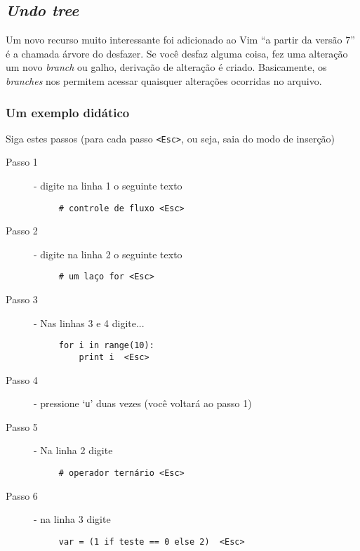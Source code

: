 \subsection{{\em Undo tree}}
\label{Undo tree}

Um novo recurso muito interessante foi adicionado ao Vim ``a partir da
versão 7''  é a chamada árvore do desfazer.  Se
você desfaz alguma coisa, fez uma alteração um novo {\em branch} ou
galho, derivação de alteração é criado.  Basicamente, os {\em branches}
nos permitem acessar quaisquer alterações ocorridas no arquivo.

\subsubsection{Um exemplo didático}
\label{Um exemplo didático}

Siga estes passos (para cada passo \verb|<Esc>|, ou seja, saia do modo
de inserção)


\begin{description}
\item [Passo 1] - digite na linha 1 o seguinte texto
\begin{verbatim}
     # controle de fluxo <Esc>
\end{verbatim}

\item [Passo 2] - digite na linha 2 o seguinte texto
\begin{verbatim}
     # um laço for <Esc>
\end{verbatim}

\item [Passo 3] - Nas linhas 3 e 4 digite...

\begin{verbatim}
     for i in range(10):
         print i  <Esc>
\end{verbatim}

\item [Passo 4] - pressione `{\tt u}' duas vezes (você voltará ao passo 1)
\item [Passo 5] - Na linha 2 digite

\begin{verbatim}
     # operador ternário <Esc>
\end{verbatim}

\item [Passo 6] - na linha 3 digite

\begin{verbatim}
     var = (1 if teste == 0 else 2)  <Esc>
\end{verbatim}

\end{description}

